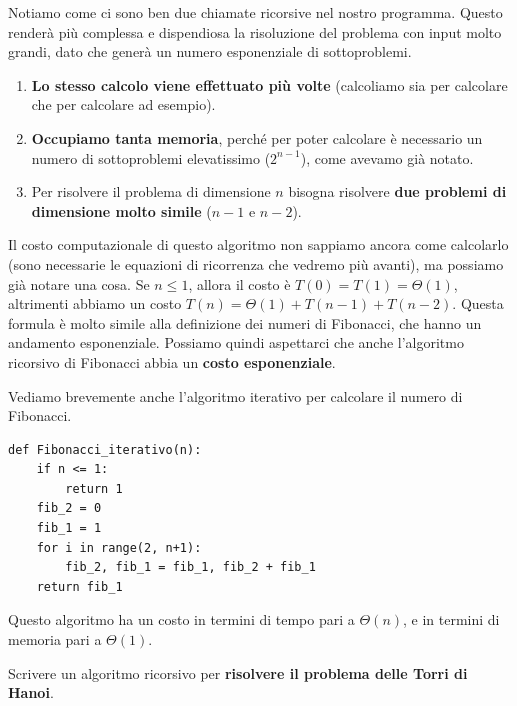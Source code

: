 \documentclass[11pt, a4paper, titlepage, oneside]{scrbook}
\begin{document}
Notiamo come ci sono ben due chiamate ricorsive nel nostro programma. Questo renderà più complessa e dispendiosa la risoluzione del problema con input molto grandi, dato che generà un numero esponenziale di sottoproblemi.

\begin{Osservazione}
\label{oss-fibonacci}
\begin{enumerate}
    \item \textbf{Lo stesso calcolo viene effettuato più volte} (calcoliamo  sia per calcolare  che per calcolare  ad esempio).
    \item \textbf{Occupiamo tanta memoria}, perché per poter calcolare  è necessario un numero di sottoproblemi elevatissimo ($2^{n-1}$), come avevamo già notato. 
    \item Per risolvere il problema di dimensione $n$ bisogna risolvere \textbf{due problemi di dimensione molto simile} ($n-1$ e $n-2$).
\end{enumerate}
\end{Osservazione}

Il costo computazionale di questo algoritmo non sappiamo ancora come calcolarlo (sono necessarie le equazioni di ricorrenza che vedremo più avanti), ma possiamo già notare una cosa. Se $n \leq 1$, allora il costo è $T(0) = T(1) = \Theta(1)$, altrimenti abbiamo un costo $T(n) = \Theta(1) + T(n-1) + T(n-2)$. Questa formula è molto simile alla definizione dei numeri di Fibonacci, che hanno un andamento esponenziale. Possiamo quindi aspettarci che anche l'algoritmo ricorsivo di Fibonacci abbia un \textbf{costo esponenziale}.

Vediamo brevemente anche l'algoritmo iterativo per calcolare il numero di Fibonacci.

\begin{lstlisting}[style=Python]
def Fibonacci_iterativo(n):
    if n <= 1:
        return 1
    fib_2 = 0
    fib_1 = 1
    for i in range(2, n+1):
        fib_2, fib_1 = fib_1, fib_2 + fib_1
    return fib_1
\end{lstlisting}
Questo algoritmo ha un costo in termini di tempo pari a $\Theta(n)$, e in termini di memoria pari a $\Theta(1)$.

\Separatore

Scrivere un algoritmo ricorsivo per \textbf{risolvere il problema delle Torri di Hanoi}. \nopagebreak
\end{document}
